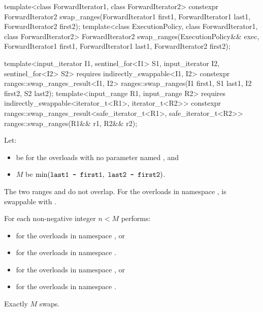%
\begin{itemdecl}
template<class ForwardIterator1, class ForwardIterator2>
  constexpr ForwardIterator2
    swap_ranges(ForwardIterator1 first1, ForwardIterator1 last1,
                ForwardIterator2 first2);
template<class ExecutionPolicy, class ForwardIterator1, class ForwardIterator2>
  ForwardIterator2
    swap_ranges(ExecutionPolicy&& exec,
                ForwardIterator1 first1, ForwardIterator1 last1,
                ForwardIterator2 first2);

template<input_iterator I1, sentinel_for<I1> S1, input_iterator I2, sentinel_for<I2> S2>
  requires indirectly_swappable<I1, I2>
  constexpr ranges::swap_ranges_result<I1, I2>
    ranges::swap_ranges(I1 first1, S1 last1, I2 first2, S2 last2);
template<input_range R1, input_range R2>
  requires indirectly_swappable<iterator_t<R1>, iterator_t<R2>>
  constexpr ranges::swap_ranges_result<safe_iterator_t<R1>, safe_iterator_t<R2>>
    ranges::swap_ranges(R1&& r1, R2&& r2);
\end{itemdecl}

\begin{itemdescr}
\pnum
Let:
\begin{itemize}
\item
   be 
  for the overloads with no parameter named , and
\item $M$ be $\min(\tcode{last1 - first1}, \ \tcode{last2 - first2})$.
\end{itemize}

\pnum
\expects
The two ranges  and 
do not overlap.
For the overloads in namespace ,
 is swappable with
.

\pnum
\effects
For each non-negative integer $n < M$ performs:
\begin{itemize}
\item
  for the overloads in namespace , or
\item
  for the overloads in namespace .
\end{itemize}

\pnum
\returns
\begin{itemize}
\item
  for the overloads in namespace , or
\item
  for the overloads in namespace .
\end{itemize}

\pnum
\complexity
Exactly $M$ swaps.
\end{itemdescr}

